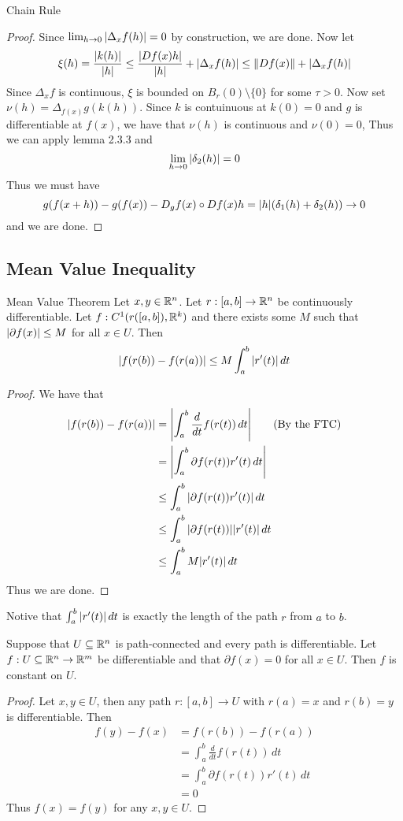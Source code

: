 \documentclass[a4paper]{article}
\begin{document}
\begin{prp}{Chain Rule}{}
\begin{proof}
Since $\lim_{h\to 0}\abs{\Delta_xf(h)}=0$ by construction, we are done. Now let $$\xi(h)=\frac{\abs{k(h)}}{\abs{h}}\leq\frac{\abs{Df(x)h}}{\abs{h}}+\abs{\Delta_xf(h)}\leq\|Df(x)\|+\abs{\Delta_xf(h)}$$ Since $\Delta_xf$ is continuous, $\xi$ is bounded on $B_r(0)\setminus\{0\}$ for some $\tau>0$. Now set $\nu(h)=\Delta_{f(x)}g(k(h))$. Since $k$ is contuinuous at $k(0)=0$ and $g$ is differentiable at $f(x)$, we have that $\nu(h)$ is continuous and $\nu(0)=0$, Thus we can apply lemma 2.3.3 and $$\lim_{h\to 0}\abs{\delta_2(h)}=0$$ Thus we must have $$g(f(x+h))-g(f(x))-D_gf(x)\circ Df(x)h=\abs{h}(\delta_1(h)+\delta_2(h))\to 0$$ and we are done. 
\end{proof}
\end{prp}

\subsection{Mean Value Inequality}
\begin{thm}{Mean Value Theorem}{} Let $x,y\in\mathbb{R}^n$. Let $r:[a,b]\to\mathbb{R}^n$ be continuously differentiable. Let $f: C^1(r([a,b]),\mathbb{R}^k)$ and there exists some $M$ such that $\abs{\partial f(x)}\leq M$ for all $x\in U$. Then $$\abs{f(r(b))-f(r(a))}\leq M\int_a^b\abs{r'(t)}\,dt$$ \tcbline
\begin{proof}
We have that 
\begin{align*}
\abs{f(r(b))-f(r(a))}&=\abs{\int_a^b\frac{d}{dt}f(r(t))\,dt}\tag{By the FTC}\\
&=\abs{\int_a^b\partial f(r(t))r'(t)\,dt}\\
&\leq\int_a^b\abs{\partial f(r(t))r'(t)}\,dt\\
&\leq\int_a^b\abs{\partial f(r(t))}\abs{r'(t)}\,dt\\
&\leq\int_a^bM\abs{r'(t)}\,dt
\end{align*}
Thus we are done. 
\end{proof}
\end{thm}

Notive that $\int_a^b\abs{r'(t)}\,dt$ is exactly the length of the path $r$ from $a$ to $b$. 

\begin{prp}{}{} Suppose that $U\subseteq\mathbb{R}^n$ is path-connected and every path is differentiable. Let $f:U\subseteq\mathbb{R}^n\to\mathbb{R}^m$ be differentiable and that $\partial f(x)=0$ for all $x\in U$. Then $f$ is constant on $U$. \tcbline
\begin{proof}
Let $x,y\in U$, then any path $r:[a,b]\to U$ with $r(a)=x$ and $r(b)=y$ is differentiable. Then 
\begin{align*}
f(y)-f(x)&=f(r(b))-f(r(a))\\
&=\int_a^b\frac{d}{dt}f(r(t))\,dt\tag{By the FTC}\\
&=\int_a^b\partial f(r(t))r'(t)\,dt\\
&=0
\end{align*}
Thus $f(x)=f(y)$ for any $x,y\in U$. 
\end{proof}
\end{prp}
\end{document}
